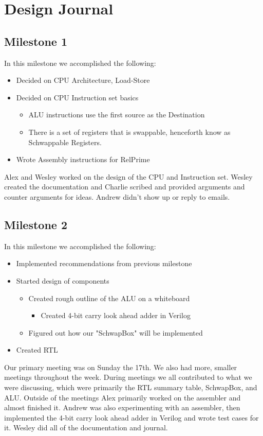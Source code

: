 \documentclass{report}
\begin{document}
\chapter{Design Journal}
	\section{Milestone 1}
		In this milestone we accomplished the following:
		\begin{itemize}
			\item Decided on CPU Architecture, Load-Store
			\item Decided on CPU Instruction set basics
			\begin{itemize}
				\item ALU instructions use the first source as the Destination
				\item There is a set of registers that is swappable, henceforth know as Schwappable Registers.
			\end{itemize}
			\item Wrote Assembly instructions for RelPrime
		\end{itemize}
		Alex and Wesley worked on the design of the CPU and Instruction set. Wesley created the documentation and Charlie scribed and provided arguments and counter arguments for ideas.  Andrew didn't show up or reply to emails.
	\section{Milestone 2}
		In this milestone we accomplished the following:
		\begin{itemize}
			\item Implemented recommendations from previous milestone
			\item Started design of components
			\begin{itemize}
				\item Created rough outline of the ALU on a whiteboard
				\begin{itemize}
					\item Created 4-bit carry look ahead adder in Verilog
				\end{itemize}
				\item Figured out how our "SchwapBox" will be implemented
			\end{itemize}
			\item Created RTL
		\end{itemize}
		Our primary meeting was on Sunday the 17th.  We also had more, smaller meetings throughout the week.  During meetings we all contributed to what we were discussing, which were primarily the RTL summary table, SchwapBox, and ALU.  Outside of the meetings Alex primarily worked on the assembler and almost finished it.  Andrew was also experimenting with an assembler, then implemented the 4-bit carry look ahead adder in Verilog and wrote test cases for it.  Wesley did all of the documentation and journal.
\end{document}
